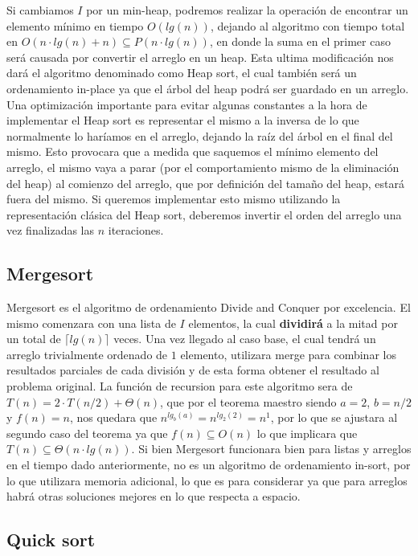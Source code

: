 Si cambiamos $I$ por un min-heap, podremos realizar la operaci\'on de encontrar un elemento m\'inimo en tiempo $O(lg(n))$, dejando al algoritmo con tiempo total en $O(n\cdot lg(n) + n) \subseteq P(n\cdot lg(n))$, en donde la suma en el primer caso ser\'a causada por convertir el arreglo en un heap. Esta ultima modificaci\'on nos dar\'a el algoritmo denominado como Heap sort, el cual tambi\'en ser\'a un ordenamiento in-place ya que el \'arbol del heap podr\'a ser guardado en un arreglo. Una optimizaci\'on importante para evitar algunas constantes a la hora de implementar el Heap sort es representar el mismo a la inversa de lo que normalmente lo har\'iamos en el arreglo, dejando la ra\'iz del \'arbol en el final del mismo. Esto provocara que a medida que saquemos el m\'inimo elemento del arreglo, el mismo vaya a parar (por el comportamiento mismo de la eliminaci\'on del heap) al comienzo del arreglo, que por definici\'on del tama\~no del heap, estar\'a fuera del mismo. Si queremos implementar esto mismo
utilizando la representaci\'on cl\'asica del Heap sort, deberemos invertir el orden del arreglo una vez finalizadas las $n$ iteraciones.

\subsection{Mergesort}

Mergesort es el algoritmo de ordenamiento Divide and Conquer por excelencia. El mismo comenzara con una lista de $I$ elementos, la cual \textbf{dividir\'a} a la mitad por un total de $\lceil lg(n) \rceil$ veces. Una vez llegado al caso base, el cual tendr\'a un arreglo trivialmente ordenado de $1$ elemento, utilizara merge para combinar los resultados parciales de cada divisi\'on y de esta forma obtener el resultado al problema original. La funci\'on de recursion para este algoritmo sera de $T(n) = 2 \cdot T(n/2) + \Theta(n)$, que por el teorema maestro siendo $a=2$, $b=n/2$ y $f(n) = n$, nos quedara que $n^{lg_b(a)} = n^{lg_2(2)} = n^1$, por lo que se ajustara al segundo caso del teorema ya que $f(n) \subseteq O(n)$ lo que implicara que $T(n) \subseteq \Theta(n \cdot lg(n))$. Si bien Mergesort funcionara bien para listas y arreglos en el tiempo dado anteriormente, no es un algoritmo de ordenamiento in-sort, por lo que utilizara memoria adicional, lo que es para considerar ya que para arreglos habr\'a otras
soluciones
mejores en lo que respecta a espacio.

\subsection{Quick sort}

